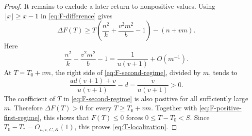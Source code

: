 \begin{proof}
It remains to exclude a later return to nonpositive values.  Using
\(\lfloor x\rfloor\ge x-1\) in \eqref{eq:F-difference} gives
\begin{equation}\label{eq:F-second-regime}
 \Delta F(T)\ge
 T\left(\frac{n^2}{k}+\frac{v^2m^2}{b}-1\right)-(n+vm).
\end{equation}
Here
\[
 \frac{n^2}{k}+\frac{v^2m^2}{b}-1
 =\frac1{u(v+1)}+O(m^{-1}).
\]
At \(T=T_0+vm\), the right side of \eqref{eq:F-second-regime}, divided by
\(m\), tends to
\[
 \frac{u d(v+1)+v}{u(v+1)}-d
 =\frac{v}{u(v+1)}>0.
\]
The coefficient of \(T\) in \eqref{eq:F-second-regime} is also positive for
all sufficiently large \(m\).  Therefore \(\Delta F(T)>0\) for every
\(T\ge T_0+vm\).  Together with \eqref{eq:F-positive-first-regime}, this
shows that \(F(T)\le0\) forces \(0\le T-T_0<S\).  Since
\(T_0-T_*=O_{u,v,C,K}(1)\), this proves \eqref{eq:T-localization}.
\end{proof}


